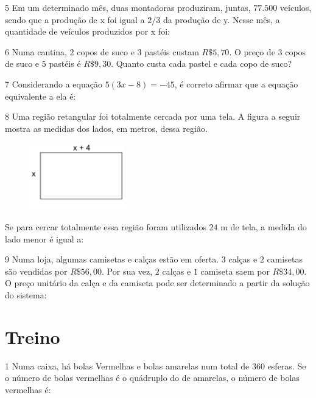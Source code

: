 \num{5}  Em um determinado mês, duas montadoras produziram, juntas, $77.500$
veículos, sendo que a produção de x foi igual a $2/3$ da produção de y. Nesse mês, a quantidade de veículos produzidos por x foi:


\num{6}  Numa cantina, $2$ copos de suco e $3$ pastéis custam $R\$5,70$. O preço de
3 copos de suco e $5$ pastéis é $R\$9,30$. Quanto custa cada pastel e cada
copo de suco?


\num{7}  Considerando a equação $5(3x - 8) = -45$, é correto afirmar que a equação equivalente a ela é:


\num{8}  Uma região retangular foi totalmente cercada por uma tela. A figura a
seguir mostra as medidas dos lados, em metros, dessa região.

\begin{figure}
\includegraphics[width=1.65625in,height=1.14583in]{./imgSAEB_6_MAT/media/image38.png}
\end{figure}

Se para cercar totalmente essa região foram utilizados $24$ m de tela, a
medida do lado menor é igual a:


\num{9} Numa loja, algumas camisetas e calças estão em oferta. $3$ calças e $2$
camisetas são vendidas por $R\$56,00$. Por sua vez, $2$ calças e $1$ camiseta
saem por $R\$34,00$. O preço unitário da calça e da camiseta pode ser
determinado a partir da solução do sistema:


\section{Treino}

\num{1}  Numa caixa, há bolas Vermelhas e bolas amarelas num total de $360$
esferas. Se o número de bolas vermelhas é o quádruplo do de amarelas, o
número de bolas vermelhas é:

